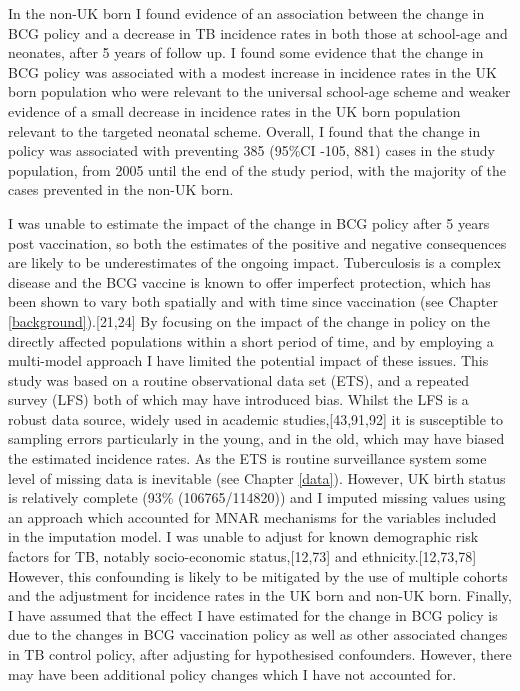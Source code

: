 \documentclass[11pt,twoside]{bristolthesis}
\begin{document}
  In the non-UK born I found evidence of an association between the change in BCG policy and a decrease in TB incidence rates in both those at school-age and neonates, after 5 years of follow up. I found some evidence that the change in BCG policy was associated with a modest increase in incidence rates in the UK born population who were relevant to the universal school-age scheme and weaker evidence of a small decrease in incidence rates in the UK born population relevant to the targeted neonatal scheme. Overall, I found that the change in policy was associated with preventing 385 (95\%CI -105, 881) cases in the study population, from 2005 until the end of the study period, with the majority of the cases prevented in the non-UK born.
  
  I was unable to estimate the impact of the change in BCG policy after 5 years post vaccination, so both the estimates of the positive and negative consequences are likely to be underestimates of the ongoing impact. Tuberculosis is a complex disease and the BCG vaccine is known to offer imperfect protection, which has been shown to vary both spatially and with time since vaccination (see Chapter \ref{background}).{[}21,24{]} By focusing on the impact of the change in policy on the directly affected populations within a short period of time, and by employing a multi-model approach I have limited the potential impact of these issues. This study was based on a routine observational data set (ETS), and a repeated survey (LFS) both of which may have introduced bias. Whilst the LFS is a robust data source, widely used in academic studies,{[}43,91,92{]} it is susceptible to sampling errors particularly in the young, and in the old, which may have biased the estimated incidence rates. As the ETS is routine surveillance system some level of missing data is inevitable (see Chapter \ref{data}). However, UK birth status is relatively complete (93\% (106765/114820)) and I imputed missing values using an approach which accounted for MNAR mechanisms for the variables included in the imputation model. I was unable to adjust for known demographic risk factors for TB, notably socio-economic status,{[}12,73{]} and ethnicity.{[}12,73,78{]} However, this confounding is likely to be mitigated by the use of multiple cohorts and the adjustment for incidence rates in the UK born and non-UK born. Finally, I have assumed that the effect I have estimated for the change in BCG policy is due to the changes in BCG vaccination policy as well as other associated changes in TB control policy, after adjusting for hypothesised confounders. However, there may have been additional policy changes which I have not accounted for.
  
\end{document}
